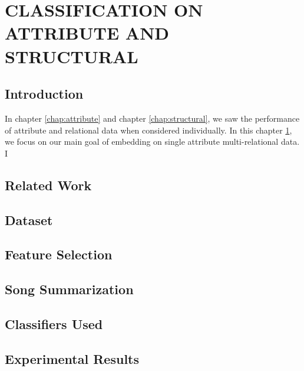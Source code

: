 \chapter{CLASSIFICATION ON ATTRIBUTE AND STRUCTURAL}
 \label{chap:attribute_structural}
\section{Introduction}
In chapter \ref{chap:attribute} and chapter \ref{chap:structural}, we saw the performance of attribute and relational data when considered individually. In this chapter \ref{chap:attribute_structural}, we focus on our main goal of embedding on single attribute multi-relational data. I 
\section{Related Work} 
 \label{sec:rwgc}

\section{Dataset}
\label{sec:datagc}

\section{Feature Selection}
\label{sec:fsgc}

\section{Song Summarization}
\label{sec:songsumgc}

\section{Classifiers Used}


\section{Experimental Results}

